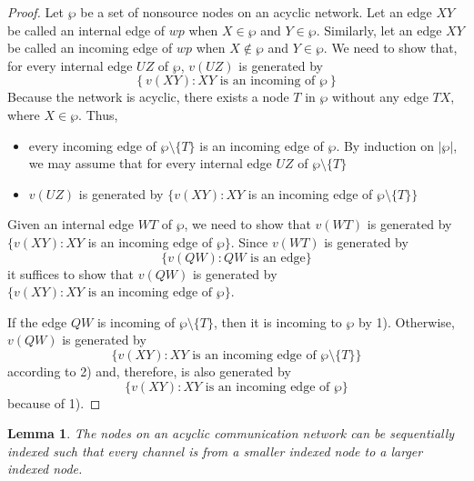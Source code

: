 \documentclass[journal]{IEEEtran}
\newtheorem*{proof}{\hskip 2em Proof}
\newtheorem{lemm}[prop]{Lemma}
\begin{document}
\begin{proof}
	Let $\wp$ be a set of nonsource nodes on an acyclic network. Let an edge $XY$ be called an internal edge of $wp$ when $X\in \wp$ and $Y\in \wp$. Similarly, let an edge $XY$ be called an incoming edge of $wp$ when $X \notin \wp$ and $Y\in \wp$. We need to show that, for every internal edge $UZ$ of $\wp$, $v(UZ)$ is generated by
	$$
	\left \{v(XY):XY \text{ is an incoming of }\wp\right \}
	$$
	Because the network is acyclic, there exists a node $T$ in $\wp$ without any edge $TX$, where $X\in \wp$. Thus,
	\begin{itemize}
		\item[1)] every incoming edge of $\wp \setminus \{T\}$ is an incoming edge of $\wp$. By induction on $|\wp|$, we may assume that for every internal edge $UZ$ of $\wp \setminus \{T\}$
		\item[2)] $v(UZ)$ is generated by $\{v(XY):XY$ is an incoming edge of $\wp \setminus \{T\}\}$
	\end{itemize}
	Given an internal edge $WT$ of $\wp$, we need to show that $v(WT)$ is generated by $\{v(XY): XY $ is an incoming edge of $\wp\}$. Since $v(WT)$ is generated by
	$$
	\{v(QW):QW\text{ is an edge}\}
	$$
	it suffices to show that $v(QW)$ is generated by $\{v(XY): XY \text{ is an incoming edge of }\wp\}$.
	\par
	If the edge $QW$ is incoming of $\wp\setminus\{T\}$, then it is incoming to $\wp$ by 1). Otherwise, $v(QW)$ is generated by
	$$\{v(XY): XY \text{ is an incoming edge of }\wp\setminus \{T\}\}$$
	according to 2) and, therefore, is also generated by
	$$
	\{v(XY): XY \text{ is an incoming edge of }\wp\}
	$$
	because of 1).	
\end{proof}


\begin{lemm}
	The nodes on an acyclic communication network can be sequentially indexed such that every channel is from a smaller indexed node to a larger indexed node.
\end{lemm}
\end{document}
